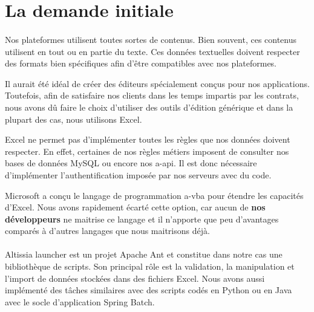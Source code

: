 \section{La demande initiale}
\label{sec:initial-request}

\paragraph{}
Nos plateformes utilisent toutes sortes de contenus.
Bien souvent, ces contenus utilisent en tout ou en partie du texte.
Ces données textuelles doivent respecter des formats bien spécifiques afin d'être compatibles avec nos plateformes.

Il aurait été idéal de créer des éditeurs spécialement conçus pour nos applications.
Toutefois, afin de satisfaire nos clients dans les temps impartis par les contrats, nous avons dû faire le choix d'utiliser des outils d'édition générique et dans la plupart des cas, nous utilisons Excel.

Excel ne permet pas d'implémenter toutes les règles que nos données doivent respecter.
En effet, certaines de nos règles métiers imposent de consulter nos bases de données MySQL\fnmark{} ou encore nos \gls{a-api}.
Il est donc nécessaire d'implémenter l'authentification imposée par nos serveurs avec du code.

Microsoft a conçu le langage de programmation \gls{a-vba} pour étendre les capacités d'Excel\cite{o365devx_pris_nodate}.
Nous avons rapidement écarté cette option, car aucun de \textbf{nos développeurs} ne maitrise ce langage et il n'apporte que peu d'avantages comparés à d'autres langages que nous maitrisons déjà.



\paragraph{}
Altissia launcher est un projet Apache Ant\fnmark{} et constitue dans notre cas une bibliothèque de scripts.
Son principal rôle est la validation, la manipulation et l'import de données stockées dans des fichiers Excel.
Nous avons aussi implémenté des tâches similaires avec des scripts codés en Python\fnmark{} ou en Java avec le socle d'application\fnmark{} Spring\fnmark{} Batch\fnmark{}.


